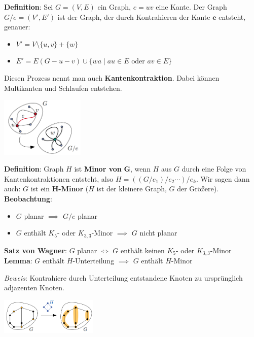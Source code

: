 \textbf{Definition}: Sei $G=(V,E)$ ein Graph, $e=uv$ eine Kante. Der Graph $G/e=(V',E')$ ist der Graph, der durch Kontrahieren der Kante $\boldsymbol{e}$ entsteht, genauer:
\begin{itemize}
	\item $V'=V\setminus\{u,v\}+\{w\}$
	\item $E'=E(G-u-v)\cup\{wa\mid au\in E \text{ oder } av\in E\}$
\end{itemize}
Diesen Prozess nennt man auch \textbf{Kantenkontraktion}. Dabei können Multikanten und Schlaufen entstehen.
\begin{center}
	\includegraphics[width=0.3\textwidth]{images/kantenkontraktion.png}
\end{center}
\bigskip
\textbf{Definition}: Graph $H$ ist \textbf{Minor von} $\boldsymbol{G}$, wenn $H$ aus $G$ durch eine Folge von Kantenkontraktionen entsteht, also $H=((G/e_1)/e_2\cdots)/e_k$. Wir sagen dann auch: $G$ ist ein \textbf{$\boldsymbol{H}$-Minor} ($H$ ist der kleinere Graph, $G$ der Größere).\\

\textbf{Beobachtung}:
\begin{itemize}
	\item $G$ planar $\implies$ $G/e$ planar
	\item $G$ enthält $K_5$- oder $K_{3,3}$-Minor $\implies$ $G$ nicht planar
\end{itemize}
\bigskip
\textbf{Satz von Wagner}: $G$ planar $\iff$ $G$ enthält keinen $K_5$- oder $K_{3,3}$-Minor\\

\textbf{Lemma}: $G$ enthält $H$-Unterteilung $\implies $ $G$ enthält $H$-Minor

\textit{Beweis}: Kontrahiere durch Unterteilung entstandene Knoten zu ursprünglich adjazenten Knoten.
\begin{center}
	\includegraphics[width=0.35\textwidth]{images/um-skizze.png}
\end{center}
\pagebreak

